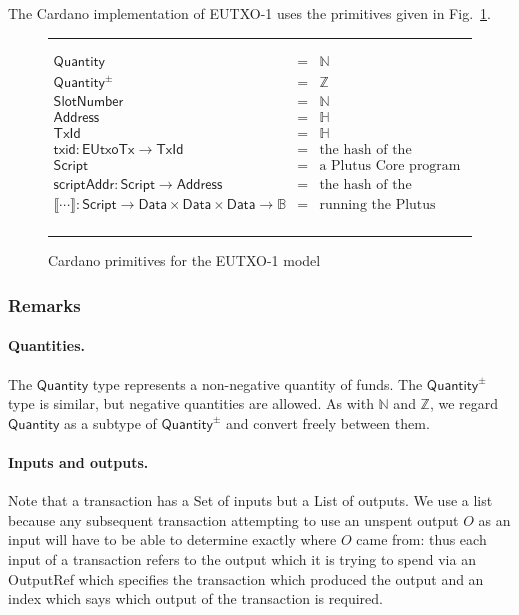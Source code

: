 \documentclass[a4paper]{article}
\newcommand{\s}{\textsf}  %
\newcommand{\msf}[1]{\ensuremath{\mathsf{#1}}}
\newcommand\rfskip{7pt}
\newenvironment{ruledfigure}[1]{\begin{figure}[#1]\hrule\vspace{\rfskip}}{\vspace{\rfskip}\hrule\end{figure}}
\newcommand{\script}{\ensuremath{\s{Script}}}
\newcommand{\scriptAddr}{\msf{scriptAddr}}
\newcommand{\TxId}{\ensuremath{\s{TxId}}}
\newcommand{\txId}{\msf{txid}}
\newcommand{\Address}{\ensuremath{\s{Address}}}
\newcommand{\Data}{\ensuremath{\s{Data}}}
\newcommand{\slotnum}{\ensuremath{\s{SlotNumber}}}
\newcommand{\eutxotx}{\msf{EUtxoTx}}
\newcommand{\qty}{\ensuremath{\s{Quantity}}}
\newcommand{\qtypm}{\ensuremath{\s{Quantity}^{\pm}}}
\newcommand\B{\ensuremath{\mathbb{B}}}
\newcommand\N{\ensuremath{\mathbb{N}}}
\newcommand\Z{\ensuremath{\mathbb{Z}}}
\renewcommand\H{\ensuremath{\mathbb{H}}}
\begin{document}
The Cardano implementation of EUTXO-1 uses the primitives given in
Fig.~\ref{fig:eutxo-1-types-cardano}.

\begin{ruledfigure}{H}
  \begin{displaymath}
  \begin{array}{rll}
    \qty{} &=& \N\\
    \qtypm &=& \Z\\
    \slotnum &=& \N\\
    \Address &=& \H\\
    \TxId &=& \H\\
    \txId : \eutxotx \rightarrow \TxId &=& \mbox{the hash of the transaction}\\
    \script &=& \mbox{a Plutus Core program}\\
    \scriptAddr : \script \rightarrow \Address &=& \mbox{the hash of the program}\\
    \llbracket \cdots \rrbracket : \script \rightarrow \Data \times \Data \times
    \Data \rightarrow \B &=& \mbox{running the Plutus Core interpreter}\\
  \end{array}
  \end{displaymath}
  \caption{Cardano primitives for the EUTXO-1 model}
  \label{fig:eutxo-1-types-cardano}
\end{ruledfigure}

\subsubsection{Remarks}
\paragraph{Quantities. }
The \qty{} type represents a non-negative quantity of funds.  The \qtypm{} type
is similar, but negative quantities are allowed.  As with \N{} and \Z{}, we regard
\qty{} as a subtype of \qtypm{} and convert freely between them.

\paragraph{Inputs and outputs. } Note that a transaction has a
\textsf{Set} of inputs but a \textsf{List} of outputs. We use a list
because any subsequent transaction attempting to use an unspent output
$O$ as an input will have to be able to determine exactly where $O$
came from: thus each input of a transaction refers to the output which
it is trying to spend via an \s{OutputRef} which specifies the
transaction which produced the output and an index which says which
output of the transaction is required.
\end{document}
